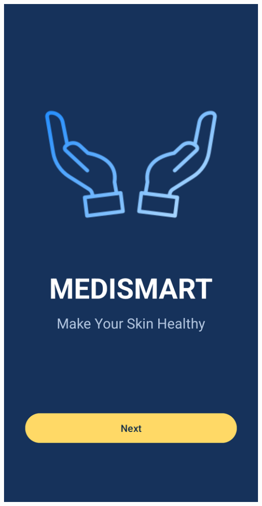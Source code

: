 \documentclass[journal,article,submit,pdftex,moreauthors]{Definitions/mdpi}
\begin{document}
\begin{itemize}
\begin{itemize}
        \vspace{5pt}
        
        \hspace{4em}
        \begin{minipage}{0.25\textwidth}
            \centering
            \includegraphics[width=\textwidth]{images/a1.png}

\end{minipage}
\end{itemize}
\end{itemize}
\end{document}

